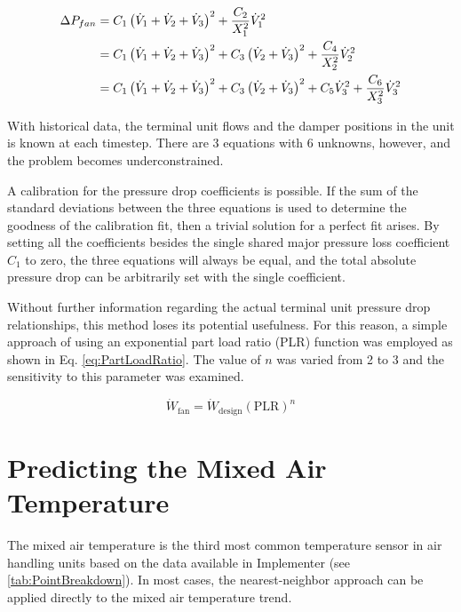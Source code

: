 \begin{align}
    \Delta P_{fan}  &= C_1 \left(\dot{V}_{1}+\dot{V}_{2}+\dot{V}_{3} \right)^2 + \frac{C_2}{X_{1}^2}\dot{V}_{1}^2 \\
                    &= C_1 \left(\dot{V}_{1}+\dot{V}_{2}+\dot{V}_{3} \right)^2 + C_3\left(\dot{V}_{2}+\dot{V}_{3} \right)^2 + \frac{C_4}{X_{2}^2}\dot{V}_{2}^2 \\
                    &= C_1 \left(\dot{V}_{1}+\dot{V}_{2}+\dot{V}_{3} \right)^2 + C_3\left(\dot{V}_{2}+\dot{V}_{3} \right)^2 + C_5\dot{V}_{3}^2 + \frac{C_6}{X_{3}^2}\dot{V}_{3}^2 
\end{align}

With historical data, the terminal unit flows and the
damper positions in the unit is known at each timestep. There are 3 equations with 6
unknowns, however, and the problem becomes underconstrained. 

A calibration for the pressure drop coefficients is possible. If the sum
of the standard deviations between the three equations is used to
determine the goodness of the calibration fit, then a trivial solution
for a perfect fit arises. By setting all the coefficients besides the
single shared major pressure loss coefficient \(C_1\) to zero, the three
equations will always be equal, and the total absolute pressure drop can
be arbitrarily set with the single coefficient. 

Without further information regarding the actual terminal unit pressure
drop relationships, this method loses its potential usefulness. For this
reason, a simple approach of using an exponential part load ratio (PLR)
function was employed as shown in Eq. \ref{eq:PartLoadRatio}. The value
of \(n\) was varied from 2 to 3 and the sensitivity to this parameter was 
examined. 

\begin{equation}\label{eq:PartLoadRatio}
    \dot{W}_{\text{fan}} = \dot{W}_{\text{design}} \left(\text{PLR}\right)^n
\end{equation}

\section{Predicting the Mixed Air Temperature}

The mixed air temperature is the third most common temperature sensor in
air handling units based on the data available in Implementer 
(see \tableref{} \ref{tab:PointBreakdown}). In most cases, the nearest-neighbor 
approach can be applied directly to the mixed air temperature trend. 

